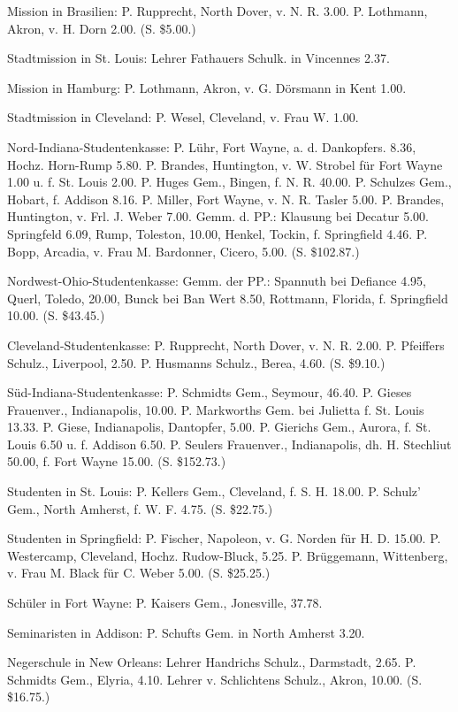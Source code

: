 Mission in Brasilien: P. Rupprecht, North Dover, v. N. R. 3.00. P. Lothmann, Akron, v. H. Dorn 2.00. (S. \$5.00.)

Stadtmission in St. Louis: Lehrer Fathauers Schulk. in Vincennes 2.37.

Mission in Hamburg: P. Lothmann, Akron, v. G. Dörsmann in Kent 1.00.

Stadtmission in Cleveland: P. Wesel, Cleveland, v. Frau W. 1.00.

Nord-Indiana-Studentenkasse: P. Lühr, Fort Wayne, a. d. Dankopfers. 8.36, Hochz. Horn-Rump 5.80. P. Brandes, Huntington, v. W. Strobel für Fort Wayne 1.00 u. f. St. Louis 2.00. P. Huges Gem., Bingen, f. N. R. 40.00. P. Schulzes Gem., Hobart, f. Addison 8.16. P. Miller, Fort Wayne, v. N. R. Tasler 5.00. P. Brandes, Huntington, v. Frl. J. Weber 7.00. Gemm. d. PP.: Klausung bei Decatur 5.00. Springfeld 6.09, Rump, Toleston, 10.00, Henkel, Tockin, f. Springfield 4.46. P. Bopp, Arcadia, v. Frau M. Bardonner, Cicero, 5.00. (S. \$102.87.)

Nordwest-Ohio-Studentenkasse: Gemm. der PP.: Spannuth bei Defiance 4.95, Querl, Toledo, 20.00, Bunck bei Ban Wert 8.50, Rottmann, Florida, f. Springfield 10.00. (S. \$43.45.)

Cleveland-Studentenkasse: P. Rupprecht, North Dover, v. N. R. 2.00. P. Pfeiffers Schulz., Liverpool, 2.50. P. Husmanns Schulz., Berea, 4.60. (S. \$9.10.)

Süd-Indiana-Studentenkasse: P. Schmidts Gem., Seymour, 46.40. P. Gieses Frauenver., Indianapolis, 10.00. P. Markworths Gem. bei Julietta f. St. Louis 13.33. P. Giese, Indianapolis, Dantopfer, 5.00. P. Gierichs Gem., Aurora, f. St. Louis 6.50 u. f. Addison 6.50. P. Seulers Frauenver., Indianapolis, dh. H. Stechliut 50.00, f. Fort Wayne 15.00. (S. \$152.73.)

Studenten in St. Louis: P. Kellers Gem., Cleveland, f. S. H. 18.00. P. Schulz’ Gem., North Amherst, f. W. F. 4.75. (S. \$22.75.)

Studenten in Springfield: P. Fischer, Napoleon, v. G. Norden für H. D. 15.00. P. Westercamp, Cleveland, Hochz. Rudow-Bluck, 5.25. P. Brüggemann, Wittenberg, v. Frau M. Black für C. Weber 5.00. (S. \$25.25.)

Schüler in Fort Wayne: P. Kaisers Gem., Jonesville, 37.78.

Seminaristen in Addison: P. Schufts Gem. in North Amherst 3.20.

Negerschule in New Orleans: Lehrer Handrichs Schulz., Darmstadt, 2.65. P. Schmidts Gem., Elyria, 4.10. Lehrer v. Schlichtens Schulz., Akron, 10.00. (S. \$16.75.)

